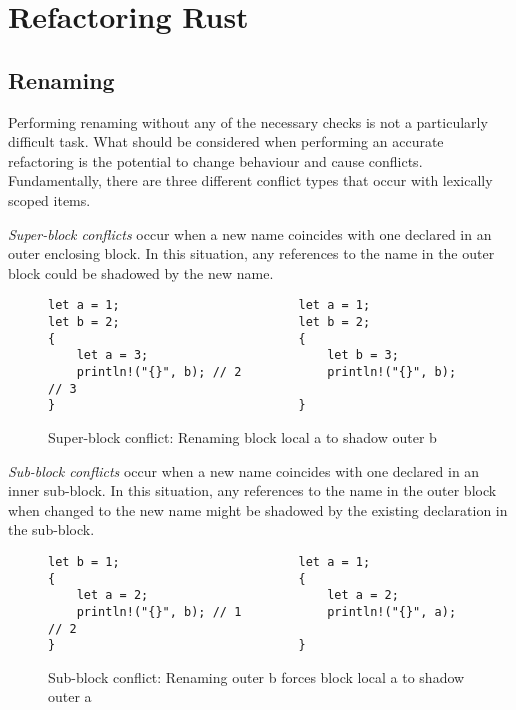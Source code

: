 \section{Refactoring Rust}\label{C:wd}

\subsection{Renaming}

Performing renaming without any of the necessary checks is not a particularly difficult task. What should be considered when performing an accurate refactoring is the potential to change behaviour and cause conflicts. Fundamentally, there are three different conflict types that occur with lexically scoped items.

\textit{Super-block conflicts} occur when a new name coincides with one declared in an outer enclosing block. In this situation, any references to the name in the outer block could be shadowed by the new name.

\begin{figure}[h]
\begin{verbatim}
let a = 1;                         let a = 1;
let b = 2;                         let b = 2;
{                                  {
    let a = 3;                         let b = 3;
    println!("{}", b); // 2            println!("{}", b); // 3
}                                  }
\end{verbatim}
\caption{Super-block conflict: Renaming block local a to shadow outer b}
\label{Fig:super}
\end{figure}

\textit{Sub-block conflicts} occur when a new name coincides with one declared in an inner sub-block. In this situation, any references to the name in the outer block when changed to the new name might be shadowed by the existing declaration in the sub-block.

\begin{figure}[h]
\begin{verbatim}
let b = 1;                         let a = 1;
{                                  {
    let a = 2;                         let a = 2;
    println!("{}", b); // 1            println!("{}", a); // 2
}                                  }
\end{verbatim}
\caption{Sub-block conflict: Renaming outer b forces block local a to shadow outer a}
\label{Fig:sub}
\end{figure}

